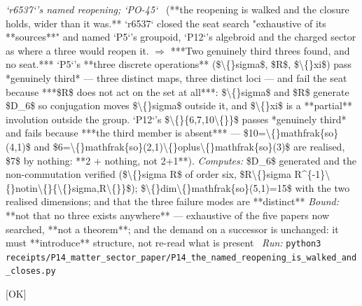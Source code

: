 \begin{description}
\textit{`r6537`'s named reopening; `PO-45`} \ (**the reopening is walked and the closure holds, wider than it was.** `r6537` closed the seat search "exhaustive of its **sources**" and named `P5`'s groupoid, `P12`'s algebroid and the charged sector as where a three would reopen it. \ensuremath{\Rightarrow} ***Two genuinely third threes found, and no seat.*** `P5`'s **three discrete operations** (\$\textbackslash\{\}sigma\$, \$R\$, \$\textbackslash\{\}xi\$) pass *genuinely third* --- three distinct maps, three distinct loci --- and fail the seat because ***\$R\$ does not act on the set at all***: \$\textbackslash\{\}sigma\$ and \$R\$ generate \$D\_6\$ so conjugation moves \$\textbackslash\{\}sigma\$ outside it, and \$\textbackslash\{\}xi\$ is a **partial** involution outside the group. `P12`'s \$\textbackslash\{\}\{6,7,10\textbackslash\{\}\}\$ passes *genuinely third* and fails because ***the third member is absent*** --- \$10=\textbackslash\{\}mathfrak\{so\}(4,1)\$ and \$6=\textbackslash\{\}mathfrak\{so\}(2,1)\textbackslash\{\}oplus\textbackslash\{\}mathfrak\{so\}(3)\$ are realised, \$7\$ by nothing: **2 + nothing, not 2+1**). 
\emph{Computes:} \$D\_6\$ generated and the non-commutation verified (\$\textbackslash\{\}sigma R\$ of order six, \$R\textbackslash\{\}sigma R\textasciicircum{}\{-1\}\textbackslash\{\}notin\textbackslash\{\}\{\textbackslash\{\}sigma,R\textbackslash\{\}\}\$); \$\textbackslash\{\}dim\textbackslash\{\}mathfrak\{so\}(5,1)=15\$ with the two realised dimensions; and that the three failure modes are **distinct**
 \emph{Bound:}  **not that no three exists anywhere** --- exhaustive of the five papers now searched, **not a theorem**; and the demand on a successor is unchanged: it must **introduce** structure, not re-read what is present
\ \emph{Run:} \texttt{python3 receipts/P14\_matter\_sector\_paper/P14\_the\_named\_reopening\_is\_walked\_and\_closes.py}
\item[\rcptlabel{P14_the_six_star_disjunction_may_be_malformed}{P14R68}\textbf{P14R68}\quad\texttt{P14\_the\_six\_star\_disjunction\_may\_be\_malformed}]\hfill\textsf{[OK]}\\

\end{description}
